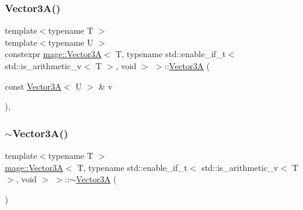 \subsubsection{\texorpdfstring{Vector3\+A()}{Vector3A()}\hspace{0.1cm}{\footnotesize\ttfamily [8/8]}}
{\footnotesize\ttfamily template$<$typename T $>$ \\
template$<$typename U $>$ \\
constexpr \hyperlink{structmage_1_1_vector3_a}{mage\+::\+Vector3A}$<$ T, typename std\+::enable\+\_\+if\+\_\+t$<$ std\+::is\+\_\+arithmetic\+\_\+v$<$ T $>$, void $>$ $>$\+::\hyperlink{structmage_1_1_vector3_a}{Vector3A} (\begin{DoxyParamCaption}\item[{const \hyperlink{structmage_1_1_vector3_a}{Vector3A}$<$ U $>$ \&}]{v }\end{DoxyParamCaption})\hspace{0.3cm}{\ttfamily [explicit]}, {\ttfamily [noexcept]}}

\hypertarget{structmage_1_1_vector3_a_3_01_t_00_01typename_01std_1_1enable__if__t_3_01std_1_1is__arithmetic__7070ab83646a86866d1e3c9d7eeea37a_a55cb7ee7cc304362dee2716e65c63771}{}\label{structmage_1_1_vector3_a_3_01_t_00_01typename_01std_1_1enable__if__t_3_01std_1_1is__arithmetic__7070ab83646a86866d1e3c9d7eeea37a_a55cb7ee7cc304362dee2716e65c63771} 
\subsubsection{\texorpdfstring{$\sim$\+Vector3\+A()}{~Vector3A()}}
{\footnotesize\ttfamily template$<$typename T $>$ \\
\hyperlink{structmage_1_1_vector3_a}{mage\+::\+Vector3A}$<$ T, typename std\+::enable\+\_\+if\+\_\+t$<$ std\+::is\+\_\+arithmetic\+\_\+v$<$ T $>$, void $>$ $>$\+::$\sim$\hyperlink{structmage_1_1_vector3_a}{Vector3A} (\begin{DoxyParamCaption}{ }\end{DoxyParamCaption})\hspace{0.3cm}{\ttfamily [default]}}



